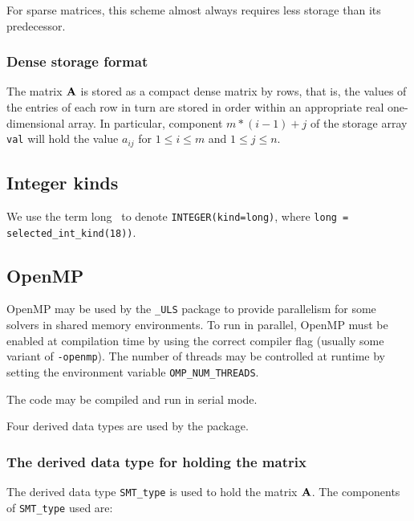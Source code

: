 \documentclass{galahad}
\newcommand{\packagename}{ULS}
\newcommand{\fullpackagename}{\libraryname\_\-\packagename}
\begin{document}
For sparse matrices, this scheme almost always requires less storage than 
its predecessor.

\subsubsection{Dense storage format}\label{dense}
The matrix ${\mathbf{A}}$ is stored as a compact 
dense matrix by rows, that is, the values of the entries of each row in turn are
stored in order within an appropriate real one-dimensional array.
In particular,
component $m \ast (i-1) + j$ of the storage array {\tt val}  
will hold the value $a_{ij}$
for $1 \leq i \leq m$ and $1 \leq j \leq n$.

\subsection{Integer kinds}\label{Integer kinds}
We use the term
long \integer\ to denote {\tt INTEGER\-(kind=long)}, where 
{\tt long = selected\_int\_kind(18))}.


\subsection{OpenMP}
OpenMP may be used by the {\tt \fullpackagename} package to provide 
parallelism for some solvers in shared memory environments.  
To run in parallel, OpenMP 
must be enabled at compilation time by using the correct compiler flag 
(usually some variant of {\tt -openmp}). 
The number of threads may be controlled at runtime
by setting the environment variable {\tt OMP\_NUM\_THREADS}.

\noindent
The code may be compiled and run in serial mode.



\galtypes
Four derived data types are used by the package. 


\subsubsection{The derived data type for holding the matrix}\label{typeprob}
The derived data type {\tt SMT\_type} is used to hold the matrix ${\mathbf{A}}$. 
The components of {\tt SMT\_type} used are:
\end{document}
